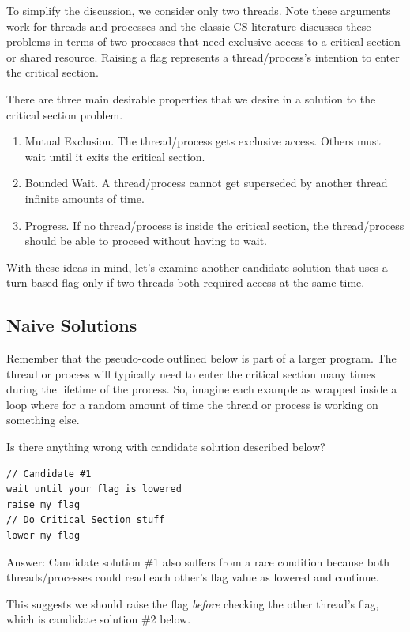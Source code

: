 To simplify the discussion, we consider only two threads.
Note these arguments work for threads and processes and the classic CS literature discusses these problems in terms of two processes that need exclusive access to a critical section or shared resource.
Raising a flag represents a thread/process's intention to enter the critical section.

There are three main desirable properties that we desire in a solution to the critical section problem.

\begin{enumerate}
\item Mutual Exclusion. The thread/process gets exclusive access.
  Others must wait until it exits the critical section.
\item Bounded Wait. A thread/process cannot get superseded by another thread infinite amounts of time.
\item Progress. If no thread/process is inside the critical section, the thread/process should be able to proceed without having to wait.
\end{enumerate}

With these ideas in mind, let's examine another candidate solution that uses a turn-based flag only if two threads both required access at the same time.

\subsection{Naive Solutions}

Remember that the pseudo-code outlined below is part of a larger program.
The thread or process will typically need to enter the critical section many times during the lifetime of the process.
So, imagine each example as wrapped inside a loop where for a random amount of time the thread or process is working on something else.

Is there anything wrong with candidate solution described below?

\begin{lstlisting}
// Candidate #1
wait until your flag is lowered
raise my flag
// Do Critical Section stuff
lower my flag
\end{lstlisting}

Answer: Candidate solution \#1 also suffers from a race condition because both threads/processes could read each other's flag value as lowered and continue.

This suggests we should raise the flag \emph{before} checking the other thread's flag, which is candidate solution \#2 below.

